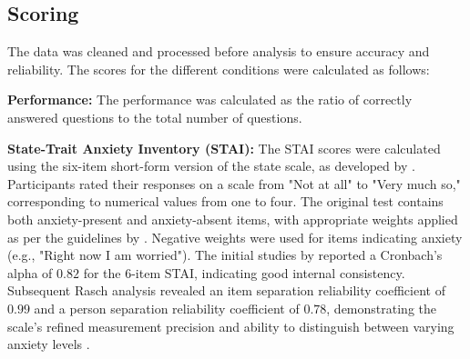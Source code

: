 \subsection{Scoring}

The data was cleaned and processed before analysis to ensure accuracy and reliability. The scores for the different conditions were calculated as follows:

\begin{APAitemize}
\item \textbf{Performance:} The performance was calculated as the ratio of correctly answered questions to the total number of questions.
\item \textbf{State-Trait Anxiety Inventory (STAI):} The STAI scores were calculated using the six-item short-form version of the state scale, as developed by \textcite{marteauDevelopmentSixitemShortform1992}. Participants rated their responses on a scale from "Not at all" to "Very much so," corresponding to numerical values from one to four. The original test contains both anxiety-present and anxiety-absent items, with appropriate weights applied as per the guidelines by \textcite{courtMeasuringPatientAnxiety2010}. Negative weights were used for items indicating anxiety (e.g., "Right now I am worried"). The initial studies by \textcite{marteauDevelopmentSixitemShortform1992} reported a Cronbach's alpha of $0.82$ for the 6-item STAI, indicating good internal consistency. Subsequent Rasch analysis revealed an item separation reliability coefficient of $0.99$ and a person separation reliability coefficient of $0.78$, demonstrating the scale's refined measurement precision and ability to distinguish between varying anxiety levels \cite{courtMeasuringPatientAnxiety2010}.

\end{APAitemize}